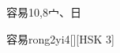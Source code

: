 \begin{entry}{容易}{10,8}{⼧、⽇}
  \begin{phonetics}{容易}{rong2yi4}[][HSK 3]
  \end{phonetics}
\end{entry}
